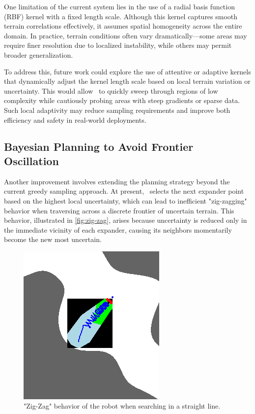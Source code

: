 One limitation of the current system lies in the use of a radial basis function (RBF) kernel with a fixed length scale. Although this kernel captures smooth terrain correlations effectively, it assumes spatial homogeneity across the entire domain. In practice, terrain conditions often vary dramatically—some areas may require finer resolution due to localized instability, while others may permit broader generalization.

To address this, future work could explore the use of attentive or adaptive kernels \cite{chen2022akattentivekernelinformation} that dynamically adjust the kernel length scale based on local terrain variation or uncertainty. This would allow \algoname\ to quickly sweep through regions of low complexity while cautiously probing areas with steep gradients or sparse data. Such local adaptivity may reduce sampling requirements and improve both efficiency and safety in real-world deployments.

\subsection{Bayesian Planning to Avoid Frontier Oscillation}

Another improvement involves extending the planning strategy beyond the current greedy sampling approach. At present, \algoname\ selects the next expander point based on the highest local uncertainty, which can lead to inefficient "zig-zagging" behavior when traversing across a discrete frontier of uncertain terrain. This behavior, illustrated in \autoref{fig:zig-zag}, arises because uncertainty is reduced only in the immediate vicinity of each expander, causing its neighbors momentarily become the new most uncertain.

\begin{figure}[h]
    \centering
    \includegraphics[width=0.5\linewidth]{figures/zigzag.png}
    \caption{"Zig-Zag" behavior of the robot when searching in a straight line.}
    \label{fig:zig-zag}
\end{figure}

